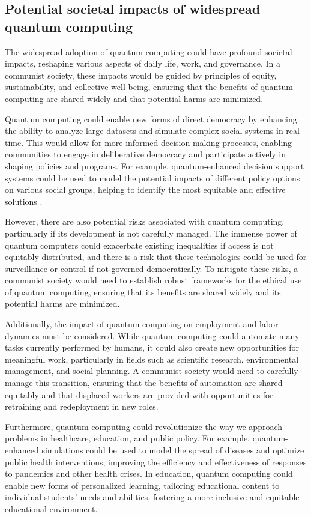 \subsection{Potential societal impacts of widespread quantum computing}

The widespread adoption of quantum computing could have profound societal impacts, reshaping various aspects of daily life, work, and governance. In a communist society, these impacts would be guided by principles of equity, sustainability, and collective well-being, ensuring that the benefits of quantum computing are shared widely and that potential harms are minimized.

Quantum computing could enable new forms of direct democracy by enhancing the ability to analyze large datasets and simulate complex social systems in real-time. This would allow for more informed decision-making processes, enabling communities to engage in deliberative democracy and participate actively in shaping policies and programs. For example, quantum-enhanced decision support systems could be used to model the potential impacts of different policy options on various social groups, helping to identify the most equitable and effective solutions \cite[pp.~150-155]{QuantumSocietyImpact2021}.

However, there are also potential risks associated with quantum computing, particularly if its development is not carefully managed. The immense power of quantum computers could exacerbate existing inequalities if access is not equitably distributed, and there is a risk that these technologies could be used for surveillance or control if not governed democratically. To mitigate these risks, a communist society would need to establish robust frameworks for the ethical use of quantum computing, ensuring that its benefits are shared widely and its potential harms are minimized.

Additionally, the impact of quantum computing on employment and labor dynamics must be considered. While quantum computing could automate many tasks currently performed by humans, it could also create new opportunities for meaningful work, particularly in fields such as scientific research, environmental management, and social planning. A communist society would need to carefully manage this transition, ensuring that the benefits of automation are shared equitably and that displaced workers are provided with opportunities for retraining and redeployment in new roles.

Furthermore, quantum computing could revolutionize the way we approach problems in healthcare, education, and public policy. For example, quantum-enhanced simulations could be used to model the spread of diseases and optimize public health interventions, improving the efficiency and effectiveness of responses to pandemics and other health crises. In education, quantum computing could enable new forms of personalized learning, tailoring educational content to individual students' needs and abilities, fostering a more inclusive and equitable educational environment.

